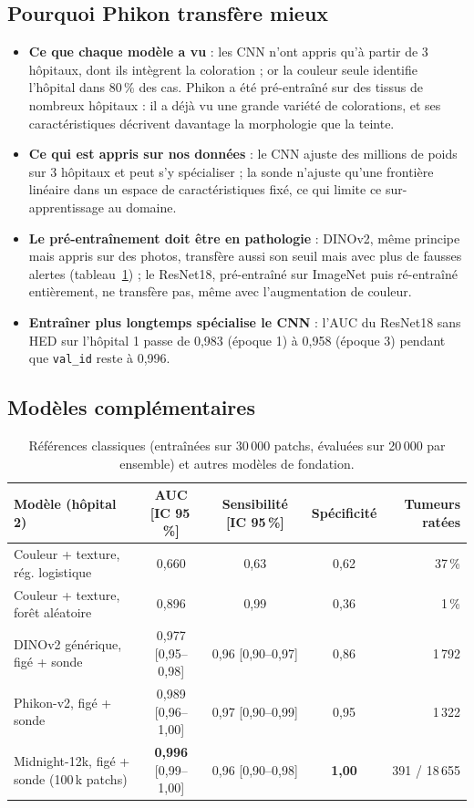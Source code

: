 \documentclass[11pt,a4paper]{article}
\newcommand{\best}[1]{\textbf{#1}}
\begin{document}
\subsection{Pourquoi Phikon transfère mieux}
\begin{itemize}
  \item \textbf{Ce que chaque modèle a vu} : les CNN n'ont appris qu'à partir de 3 hôpitaux, dont ils intègrent la coloration ; or
        la couleur seule identifie l'hôpital dans 80\,\% des cas. Phikon a été pré-entraîné sur des tissus de nombreux hôpitaux : il a
        déjà vu une grande variété de colorations, et ses caractéristiques décrivent davantage la morphologie que la teinte.
  \item \textbf{Ce qui est appris sur nos données} : le CNN ajuste des millions de poids sur 3 hôpitaux et peut s'y spécialiser ; la sonde
        n'ajuste qu'une frontière linéaire dans un espace de caractéristiques fixé, ce qui limite ce sur-apprentissage au domaine.
  \item \textbf{Le pré-entraînement doit être en pathologie} : DINOv2, même principe mais appris sur des photos, transfère aussi son
        seuil mais avec plus de fausses alertes (tableau~\ref{tab:fm}) ; le ResNet18, pré-entraîné sur ImageNet puis ré-entraîné
        entièrement, ne transfère pas, même avec l'augmentation de couleur.
  \item \textbf{Entraîner plus longtemps spécialise le CNN} : l'AUC du ResNet18 sans HED sur l'hôpital 1 passe de 0,983 (époque 1)
        à 0,958 (époque 3) pendant que \texttt{val\_id} reste à 0,996.
\end{itemize}

\subsection{Modèles complémentaires}\label{sec:fm}
\begin{table}[H]
\centering\footnotesize\setlength{\tabcolsep}{2.5pt}
\begin{tabular}{lcccr}
\toprule
\textbf{Modèle (hôpital 2)} & \textbf{AUC [IC 95\,\%]} & \textbf{Sensibilité [IC 95\,\%]} & \textbf{Spécificité} & \textbf{Tumeurs ratées} \\
\midrule
Couleur + texture, rég. logistique & 0,660 & 0,63 & 0,62 & 37\,\% \\
Couleur + texture, forêt aléatoire & 0,896 & 0,99 & 0,36 & 1\,\% \\
DINOv2 générique, figé + sonde & 0,977 [0,95–0,98] & 0,96 [0,90–0,97] & 0,86 & 1\,792 \\
Phikon-v2, figé + sonde & 0,989 [0,96–1,00] & 0,97 [0,90–0,99] & 0,95 & 1\,322 \\
Midnight-12k, figé + sonde (100\,k patchs) & \best{0,996} [0,99–1,00] & 0,96 [0,90–0,98] & \best{1,00} & 391 / 18\,655 \\
\bottomrule
\end{tabular}
\caption{Références classiques (entraînées sur 30\,000 patchs, évaluées sur 20\,000 par ensemble) et autres modèles de fondation.}
\label{tab:fm}
\end{table}
\end{document}
